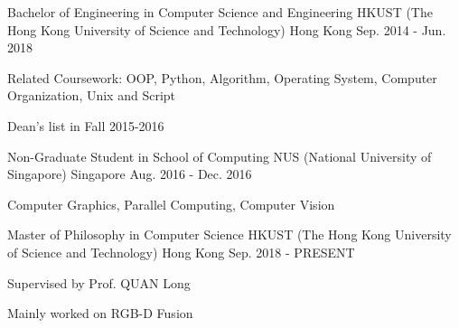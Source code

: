 


\begin{cventries}


\cventry
{Bachelor of Engineering in Computer Science and Engineering} %
{HKUST (The Hong Kong University of Science and Technology)} %
{Hong Kong} %
{Sep. 2014 - Jun. 2018} %
{ %
\begin{cvitems}
\item {Related Coursework: OOP, Python, Algorithm, Operating System, Computer Organization, Unix and Script}
\item {Dean's list in Fall 2015-2016}
\end{cvitems}
}

\cventry
{Non-Graduate Student in School of Computing} %
{NUS (National University of Singapore)} %
{Singapore} %
{Aug. 2016 - Dec. 2016} %
{ %
\begin{cvitems}
\item {Computer Graphics, Parallel Computing, Computer Vision}
\end{cvitems}
}

\cventry
{Master of Philosophy in Computer Science}
{HKUST (The Hong Kong University of Science and Technology)}
{Hong Kong}
{Sep. 2018 - PRESENT}
{
\begin{cvitems}
\item {Supervised by Prof. QUAN Long}
\item {Mainly worked on RGB-D Fusion}
\end{cvitems}
}

\end{cventries}